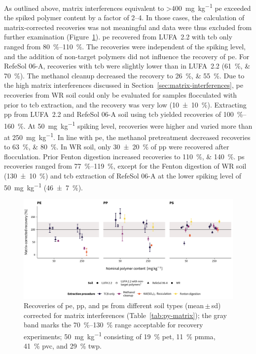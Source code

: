 As outlined above, matrix interferences equivalent to \SI{>400}{\milli\gram\per\kilo\gram} \ac{pe} exceeded the spiked polymer content by a factor of \numrange{2}{4}. In those cases, the calculation of matrix-corrected recoveries was not meaningful and data were thus excluded from further examination (Figure~\ref{fig:py-recovery}).
\Ac{pe} recovered from LUFA~2.2 with \ac{tcb} only ranged from \SIrange[range-phrase = { to }]{80}{110}{\percent}. The recoveries were independent of the spiking level, and the addition of non-target polymers did not influence the recovery of \ac{pe}. For RefeSol 06-A, recoveries with \ac{tcb} were slightly lower than in LUFA~2.2 (\SIlist{61;70}{\percent}). The methanol cleanup decreased the recovery to \SIlist{26;55}{\percent}. Due to the high matrix interferences discussed in Section~\ref{sec:matrix-interferences}, \ac{pe} recoveries from WR soil could only be evaluated for samples flocculated with  prior to \ac{tcb} extraction, and the recovery was very low (\SI{10(10)}{\percent}).
Extracting \ac{pp} from LUFA~2.2 and RefeSol 06-A soil using \ac{tcb} yielded recoveries of \SIrange{100}{160}{\percent}. At \SI{50}{\milli\gram\per\kilo\gram} spiking level, recoveries were higher and varied more than at \SI{250}{\milli\gram\per\kilo\gram}. In line with \ac{pe}, the methanol pretreatment decreased recoveries to \SIlist{63;80}{\percent}. In WR soil, only \SI{30(20)}{\percent} of \ac{pp} were recovered after  flocculation. Prior Fenton digestion increased recoveries to \SIlist{110;140}{\percent}.
\Ac{ps} recoveries ranged from \SIrange[range-phrase = { to }]{77}{119}{\percent}, except for the Fenton digestion of WR soil (\SI{130(10)}{\percent}) and \ac{tcb} extraction of RefeSol 06-A at the lower spiking level of \SI{50}{\milli\gram\per\kilo\gram} (\SI{46(7)}{\percent}).

\begin{figure}[t]
	\centering
	\includegraphics[width=\textwidth]{figures/py-recovery}
	\caption[Recoveries of \ac{pe}, \ac{pp}, and \ac{ps} from different soil types corrected for matrix interferences.]{Recoveries of \ac{pe}, \ac{pp}, and \ac{ps} from different soil types (mean\,$\pm$\,\ac{sd}) corrected for matrix interferences (Table~\protect\ref{tab:py-matrix}); the gray band marks the \SIrange{70}{130}{\percent} range acceptable for recovery experiments; \textsuperscript{\textasteriskcentered} \SI{50}{\milli\gram\per\kilo\gram} consisting of \SI{19}{\percent} \ac{pet}, \SI{11}{\percent} \ac{pmma}, \SI{41}{\percent} \ac{pvc}, and \SI{29}{\percent} \ac{twp}.}
	\label{fig:py-recovery}
\end{figure}

